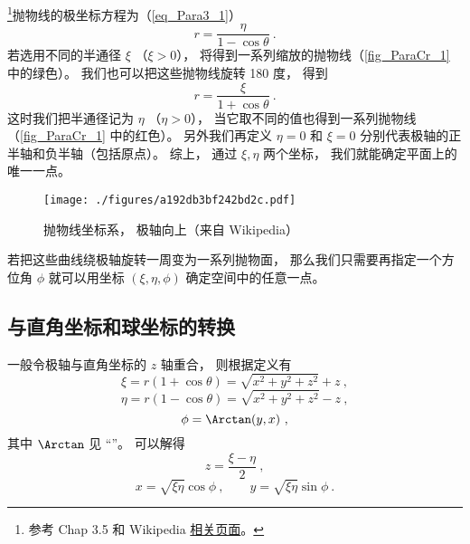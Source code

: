 

\footnote{参考 \cite{Bransden} Chap 3.5 和 Wikipedia \href{https://en.wikipedia.org/wiki/Parabolic_coordinates}{相关页面}。}抛物线的极坐标方程为（\autoref{eq_Para3_1}）
\begin{equation}\label{eq_ParaCr_1}
r = \frac{\eta}{1 - \cos \theta }~.
\end{equation}
若选用不同的半通径 $\xi$ （$\xi > 0$）， 将得到一系列缩放的抛物线（\autoref{fig_ParaCr_1} 中的绿色）。 我们也可以把这些抛物线旋转 180 度， 得到
\begin{equation}
r = \frac{\xi}{1 + \cos \theta }~.
\end{equation}
这时我们把半通径记为 $\eta$ （$\eta > 0$）， 当它取不同的值也得到一系列抛物线（\autoref{fig_ParaCr_1} 中的红色）。 另外我们再定义 $\eta = 0$ 和 $\xi = 0$ 分别代表极轴的正半轴和负半轴（包括原点）。 综上， 通过 $\xi, \eta$ 两个坐标， 我们就能确定平面上的唯一一点。

\begin{figure}[ht]
\centering
\texttt{[image: ./figures/a192db3bf242bd2c.pdf]}
\caption{抛物线坐标系， 极轴向上（来自 Wikipedia）} \label{fig_ParaCr_1}
\end{figure}

若把这些曲线绕极轴旋转一周变为一系列抛物面， 那么我们只需要再指定一个方位角 $\phi$ 就可以用坐标 $(\xi, \eta, \phi)$ 确定空间中的任意一点。

\subsection{与直角坐标和球坐标的转换}
一般令极轴与直角坐标的 $z$ 轴重合， 则根据定义有
\begin{equation}
\xi = r(1 + \cos\theta) = \sqrt{x^2 + y^2 + z^2} + z~,
\end{equation}
\begin{equation}
\eta = r(1 - \cos\theta) = \sqrt{x^2 + y^2 + z^2} - z~,
\end{equation}
\begin{equation}
\phi = \Arctan(y, x)~,
\end{equation}
其中 $\Arctan$ 见 “”。 可以解得
\begin{equation}\label{eq_ParaCr_2}
z = \frac{\xi - \eta}{2}~,
\end{equation}
\begin{equation}\label{eq_ParaCr_3}
x = \sqrt{\xi\eta}\cos\phi ~,\qquad
y = \sqrt{\xi\eta}\sin\phi~.
\end{equation}

